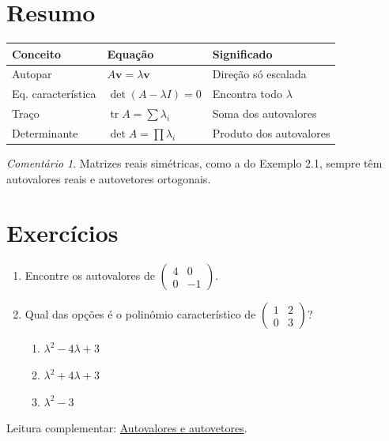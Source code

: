 \documentclass[11pt,a4paper]{article}
\theoremstyle{plain}
\theoremstyle{remark}
\newtheorem*{remark}{Comentário}
\begin{document}
\section{Resumo}

\begin{table}[h]
    \centering
    \begin{tabular}{@{}lll@{}}
        \toprule
        \textbf{Conceito} & \textbf{Equação} & \textbf{Significado} \\
        \midrule
        Autopar              & $A\mathbf{v} = \lambda\mathbf{v}$  & Direção só escalada \\
        Eq. característica   & $\det(A - \lambda I) = 0$          & Encontra todo $\lambda$ \\
        Traço                & $\operatorname{tr} A = \sum \lambda_i$ & Soma dos autovalores \\
        Determinante         & $\det A = \prod \lambda_i$         & Produto dos autovalores \\
        \bottomrule
    \end{tabular}
\end{table}

\begin{remark}
Matrizes reais simétricas, como a do Exemplo 2.1, sempre têm autovalores reais e autovetores ortogonais.
\end{remark}

\section{Exercícios}

\begin{enumerate}
    \item Encontre os autovalores de $\begin{pmatrix} 4 & 0 \\ 0 & -1 \end{pmatrix}$.
    \item Qual das opções é o polinômio característico de $\begin{pmatrix} 1 & 2 \\ 0 & 3 \end{pmatrix}$?
    \begin{enumerate}[label=\alph*),leftmargin=1.5em,topsep=0.3em,itemsep=0.15em]
        \item $\lambda^2 - 4\lambda + 3$
        \item $\lambda^2 + 4\lambda + 3$
        \item $\lambda^2 - 3$
    \end{enumerate}
\end{enumerate}

\vspace{1em}
\noindent Leitura complementar: \href{https://pt.wikipedia.org/wiki/Autovalores_e_autovetores}{Autovalores e autovetores}.
\end{document}
